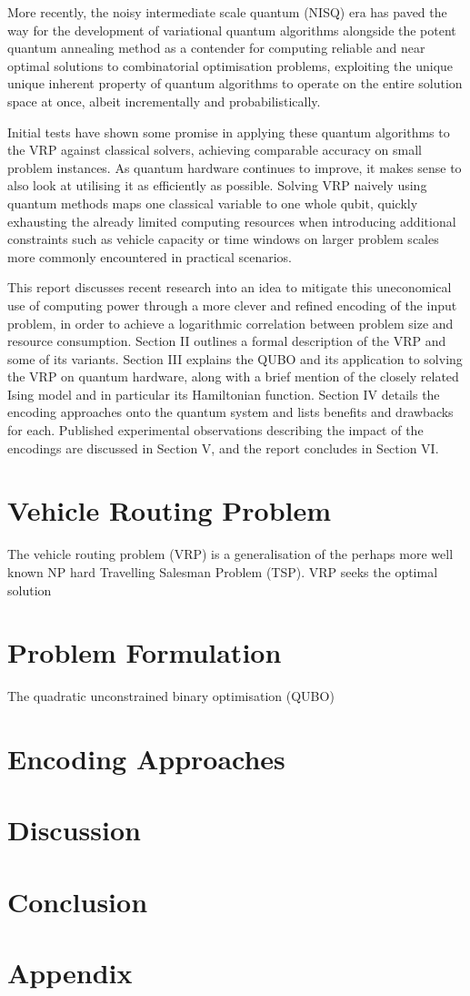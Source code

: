 \documentclass {article}
\begin{document}
More recently, the noisy intermediate scale quantum (NISQ) era has paved
the way for the development of variational quantum algorithms alongside the
potent quantum annealing method as a contender for computing reliable and
near optimal solutions to combinatorial optimisation problems, exploiting
the unique unique inherent property of quantum algorithms to operate on the
entire solution space at once, albeit incrementally and probabilistically.

Initial tests have shown some promise in applying these quantum algorithms
to the VRP against classical solvers, achieving comparable accuracy on
small problem instances. As quantum hardware continues to improve, it makes
sense to also look at utilising it as efficiently as possible. Solving VRP
naively using quantum methods maps one classical variable to one whole qubit,
quickly exhausting the already limited computing resources when introducing
additional constraints such as vehicle capacity or time windows on larger
problem scales more commonly encountered in practical scenarios.

This report discusses recent research into an idea to mitigate this
uneconomical use of computing power through a more clever and refined 
encoding of the input problem, in order to achieve a logarithmic correlation
between problem size and resource consumption.
Section II outlines a formal description of the VRP and some of its variants.
Section III explains the QUBO and its application to solving the VRP on
quantum hardware, along with a brief mention of the closely related
Ising model and in particular its Hamiltonian function.
Section IV details the encoding approaches onto the quantum system and lists
benefits and drawbacks for each.
Published experimental observations describing the impact of the encodings
are discussed in Section V,
and the report concludes in Section VI.

\section {Vehicle Routing Problem}
The vehicle routing problem (VRP) is a generalisation of the perhaps more
well known NP hard Travelling Salesman Problem (TSP). VRP seeks the optimal
solution 

\section {Problem Formulation}
The quadratic unconstrained binary optimisation (QUBO) 

\section {Encoding Approaches}

\section {Discussion}

\section {Conclusion}

\section {Appendix}
\end{document}
